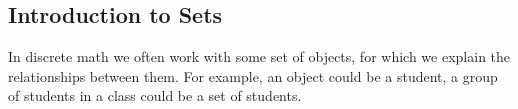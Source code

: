 \subsection{Introduction to Sets}
In discrete math we often work with some set of objects, for which we explain
the relationships between them. For example, an object could be a student, a
group of students in a class could be a set of students.